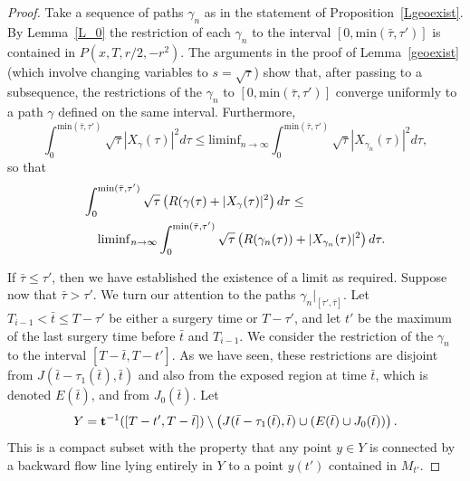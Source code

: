 \begin{proof}
Take a sequence of paths $\gamma_n$ as in the statement of
Proposition~\ref{Lgeoexist}.
 By Lemma~\ref{L_0} the
restriction of each $\gamma_n$ to the interval $[0,\mathrm{min}(\bar\tau,\tau')]$ is contained in $P(x,T,r/2,-r^2)$. The
arguments in the proof of Lemma~\ref{geoexist} (which involve
changing variables to $s=\sqrt{\tau}$) show that, after passing to a
subsequence, the restrictions of the $\gamma_n$ to $[0,\mathrm{min}(\bar\tau,\tau')]$ converge uniformly to a path $\gamma$ defined
on the same interval. Furthermore,
\begin{equation*}
\int_0^{\mathrm{min}(\bar\tau,\tau')}\sqrt{\tau}|X_\gamma(\tau)|^2d\tau\le \mathrm{liminf}_{n\rightarrow\infty}\int_0^{\mathrm{min}(\bar\tau,\tau')}\sqrt{\tau}|X_{\gamma_n}(\tau)|^2d\tau,
\end{equation*}
so that
\begin{eqnarray}\label{gamliminf1}\lefteqn{\int_0^{\mathrm{min}(\bar\tau,\tau')}\sqrt{\tau}\left(R(\gamma(\tau)+|X_\gamma(\tau)|^2\right)d\tau\le} \\
& & \mathrm{liminf}_{n\rightarrow\infty}\int_0^{\mathrm{min}(\bar\tau,\tau')}\sqrt{\tau}\left(R(\gamma_n(\tau))+|X_{\gamma_n}(\tau)|^2\right)d\tau.\nonumber
\end{eqnarray}

If $\bar\tau\le \tau'$, then we have established the existence of a
limit as required. Suppose now that $\bar\tau>\tau'$. We turn our
attention to the paths $\gamma_n|_{[\tau',\bar\tau]}$. Let
$T_{i-1}<\bar t\le T-\tau'$ be either a surgery time or $T-\tau'$, and let $t'$ be the
maximum of the last surgery time before $\bar t$ and $T_{i-1}$. We consider the
restriction of the $\gamma_n$ to the interval $[T-\bar t,T-t']$. As
we have seen, these restrictions  are disjoint from $J(\bar
t-\tau_1(\bar t),\bar t)$ and also from the exposed region at time
$\bar t$, which is denoted $E(\bar t)$,  and from $J_0(\bar t)$. Let
$$Y={\bf t}^{-1}([T-t',T-\bar t])\setminus
\left(J(\bar t-\tau_1(\bar t),\bar t)\cup (E(\bar t)\cup J_0(\bar
t))\right).$$ This is a compact subset with the property that any
point $y\in Y$ is connected by a backward flow line lying entirely
in $Y$ to a point $y(t')$ contained in $M_{t'}$.



\end{proof}
